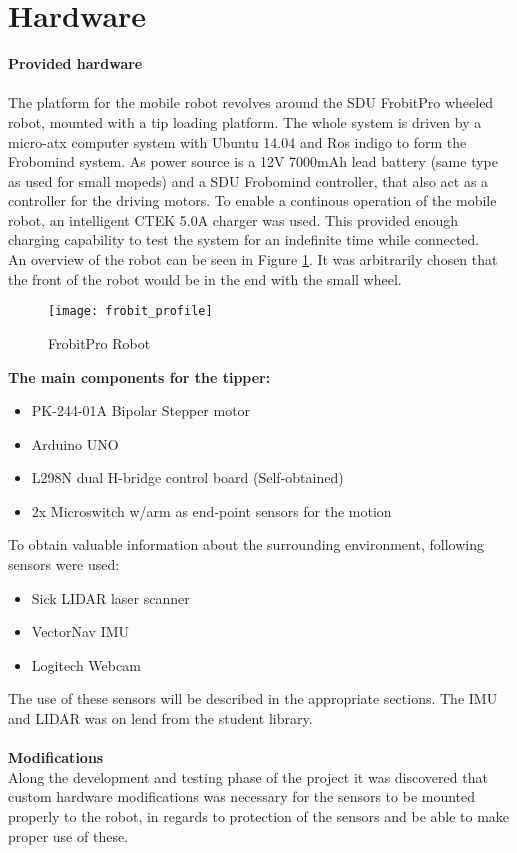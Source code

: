 \section{Hardware} %
\label{sec:mr_hardware}

\textbf{Provided hardware}
\\
\\
The platform for the mobile robot revolves around the SDU FrobitPro wheeled 
robot, mounted with a tip loading platform. The whole system is driven 
by a micro-atx computer system with Ubuntu 14.04 and Ros indigo to form the 
Frobomind system. As power source is a 12V 7000mAh lead battery (same type as 
used for 
small mopeds) and a SDU Frobomind controller, that also act as a controller for 
the driving motors. To enable a continous operation of the mobile robot, an 
intelligent CTEK 5.0A charger was used. This provided enough charging 
capability to test the system for an indefinite time while connected.\\ An 
overview of the robot can be seen in Figure \ref{fig:frobit}. It was 
arbitrarily 
chosen that the front of the robot would be in the end with the small wheel.\\
\begin{figure}[H]
	\centering
	\texttt{[image: frobit\_profile]}
	\caption{FrobitPro Robot}
	\label{fig:frobit}
	\end{figure}
\textbf{The main components for the tipper:}
\begin{itemize}
	\item PK-244-01A Bipolar Stepper motor
	\item Arduino UNO
	\item L298N dual H-bridge control board (Self-obtained)
	\item 2x Microswitch w/arm as end-point sensors for the motion
\end{itemize}   

To obtain valuable information about the surrounding environment, following 
sensors were used:
\begin{itemize}
	\item Sick LIDAR laser scanner
	\item VectorNav	 IMU
	\item Logitech Webcam
\end{itemize} 

The use of these sensors will be described in the appropriate sections. The IMU 
and LIDAR was on lend from the student library.\\
\\
\textbf{Modifications}\\
Along the development and testing phase of the project it was discovered that 
custom hardware modifications was necessary for the sensors to be mounted 
properly to the robot, in regards to protection of the sensors and be able to 
make proper use of these.\\

